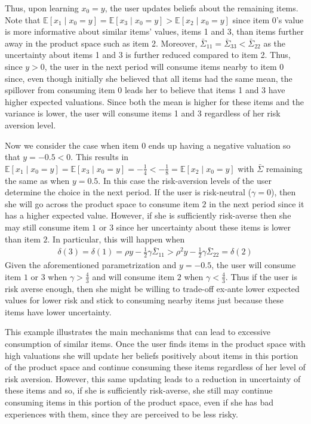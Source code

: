 \documentclass[sigconf]{acmart}
\begin{document}
Thus, upon learning $x_0=y$, the user updates beliefs about the remaining items. Note that $\mathbb{E}[x_1\mid x_0=y] = \mathbb{E}[x_3\mid x_0=y] > \mathbb{E}[x_2\mid x_0=y]$ since item 0's value is more informative about similar items' values, items 1 and 3, than items further away in the product space such as item 2. Moreover, $\bar{\Sigma}_{11} = \bar{\Sigma}_{33} < \bar{\Sigma}_{22}$ as the uncertainty about items 1 and 3 is further reduced compared to item 2. Thus, since $y > 0$, the user in the next period will consume items nearby to item 0 since, even though initially she believed that all items had the same mean, the spillover from consuming item 0 leads her to believe that items 1 and 3 have higher expected valuations. Since both the mean is higher for these items and the variance is lower, the user will consume items 1 and 3 regardless of her risk aversion level.

 
Now we consider the case when item 0 ends up having a negative valuation so that $y = -0.5 < 0$. This results in $\mathbb{E}[x_1\mid x_0=y] = \mathbb{E}[x_3\mid x_0=y] = -\frac{1}{4} <  -\frac{1}{8} = \mathbb{E}[x_2\mid x_0=y]$ with $\bar{\Sigma}$ remaining the same as when $y = 0.5$. In this case the risk-aversion levels of the user determine the choice in the next period. If the user is risk-neutral ($\gamma = 0$), then she will go across the product space to consume item $2$ in the next period since it has a higher expected value. However, if she is sufficiently risk-averse then she may still consume item $1$ or $3$ since her uncertainty about these items is lower than item $2$. In particular, this will happen when 
\begin{align*}
\delta(3) = \delta(1) = \rho y - \frac{1}{2} \gamma \bar{\Sigma}_{11} > \rho^{2} y - \frac{1}{2} \gamma \bar{\Sigma}_{22} = \delta(2)
\end{align*}
Given the aforementioned parametrization and $y = -0.5$, the user will consume item $1$ or $3$ when $\gamma > \frac{4}{3}$ and will consume item $2$ when $\gamma < \frac{4}{3}$. Thus if the user is risk averse enough, then she might be willing to trade-off ex-ante lower expected values for lower risk and stick to consuming nearby items just because these items have lower uncertainty. 

 
This example illustrates the main mechanisms that can lead to excessive consumption of similar items. Once the user finds items in the product space with high valuations she will update her beliefs positively about items in this portion of the product space and continue consuming these items regardless of her level of risk aversion. However, this same updating leads to a reduction in uncertainty of these items and so, if she is sufficiently risk-averse, she still may continue consuming items in this portion of the product space, even if she has bad experiences with them, since they are perceived to be less risky. 
\end{document}

